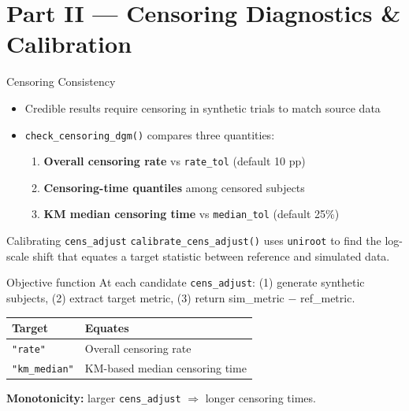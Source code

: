 \documentclass[
  11pt,
  ignorenonframetext,
  aspectratio=169,
]{beamer}
\providecommand{\tightlist}{%
  \setlength{\itemsep}{0pt}\setlength{\parskip}{0pt}}
\begin{document}
\section{Part II --- Censoring Diagnostics \&
Calibration}\label{part-ii-censoring-diagnostics-calibration}

\begin{frame}[fragile]{Censoring Consistency}
\label{censoring-consistency}
\begin{itemize}
\tightlist
\item
  Credible results require censoring in synthetic trials to match source
  data
\item
  \texttt{check\_censoring\_dgm()} compares three quantities:

  \begin{enumerate}
  \tightlist
  \item
    \textbf{Overall censoring rate} vs \texttt{rate\_tol} (default 10
    pp)
  \item
    \textbf{Censoring-time quantiles} among censored subjects
  \item
    \textbf{KM median censoring time} vs \texttt{median\_tol} (default
    25\%)
  \end{enumerate}
\end{itemize}
\end{frame}

\begin{frame}[fragile]{Calibrating \texttt{cens\_adjust}}
\label{calibrating-cens_adjust}
\texttt{calibrate\_cens\_adjust()} uses \texttt{uniroot} to find the
log-scale shift that equates a target statistic between reference and
simulated data.

\begin{block}{Objective function}
At each candidate \texttt{cens\_adjust}:
(1) generate synthetic subjects,
(2) extract target metric,
(3) return sim\_metric $-$ ref\_metric.
\end{block}

\begin{center}
\begin{tabular}{ll}
\toprule
Target & Equates \\
\midrule
\texttt{"rate"} & Overall censoring rate \\
\texttt{"km\_median"} & KM-based median censoring time \\
\bottomrule
\end{tabular}
\end{center}

\textbf{Monotonicity:} larger \texttt{cens\_adjust} \(\Rightarrow\)
longer censoring times.
\end{frame}
\end{document}
